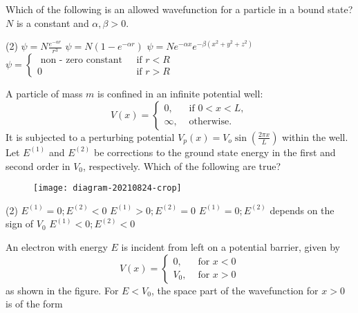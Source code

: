 \begin{enumerate}
	\begin{minipage}{\textwidth}
		\item Which of the following is an allowed wavefunction for a particle in a bound state? $N$ is a constant and $\alpha, \beta>0$.
	\end{minipage}
	\begin{tasks}(2)
		\task[\textbf{A.}] $\psi=N \frac{e^{-\alpha r}}{r^{3}}$ 
		\task[\textbf{B.}]$\psi=N\left(1-e^{-\alpha r}\right)$
		\task[\textbf{C.}]$\psi=N e^{-\alpha x} e^{-\beta\left(x^{2}+y^{2}+z^{2}\right)}$
		\task[\textbf{D.}]$\psi= \begin{cases}\text { non - zero constant } & \text { if } r<R \\ 0 & \text { if } r>R\end{cases}$
	\end{tasks}
\begin{minipage}{\textwidth}
	\item A particle of mass $m$ is confined in an infinite potential well:
	$$
	V(x)= \begin{cases}0, & \text { if } 0<x<L, \\ \infty, & \text { otherwise. }\end{cases}
	$$
	It is subjected to a perturbing potential $V_{p}(x)=V_{o} \sin \left(\frac{2 \pi x}{L}\right)$ within the well. Let $E^{(1)}$ and $E^{(2)}$ be corrections to the ground state energy in the first and second order in $V_{0}$, respectively. Which of the following are true?
	\begin{figure}[H]
		\centering
		\texttt{[image: diagram-20210824-crop]}
	\end{figure}
\end{minipage}
\begin{tasks}(2)
	\task[\textbf{A.}] $E^{(1)}=0 ; E^{(2)}<0$
	\task[\textbf{B.}]$E^{(1)}>0 ; E^{(2)}=0$
	\task[\textbf{C.}]$E^{(1)}=0 ; E^{(2)}$ depends on the sign of $V_{0}$
	\task[\textbf{D.}]$E^{(1)}<0 ; E^{(2)}<0$
\end{tasks}
\begin{minipage}{\textwidth}
	\item An electron with energy $E$ is incident from left on a potential barrier, given by
	$$
	V(x)= \begin{cases}0, & \text { for } x<0 \\ V_{0}, & \text { for } x>0\end{cases}
	$$
	as shown in the figure. For $E<V_{0}$, the space part of the wavefunction for $x>0$ is of the form

\end{minipage}
\end{enumerate}
